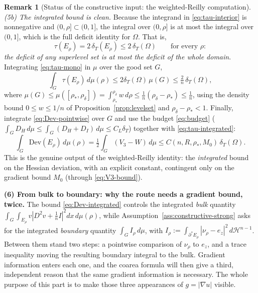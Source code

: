 \documentclass[11pt]{amsart}
\theoremstyle{definition}
\newtheorem{remark}[theorem]{Remark}
\newcommand{\Om}{\Omega}
\newcommand{\dT}{\delta_T}
\newcommand{\rstar}{\rho_*}
\newcommand{\rdel}{\rho_\delta}
\newcommand{\wt}{w}
\newcommand{\Hn}{\mathcal H^{n-1}}
\begin{document}
\begin{remark}[Status of the constructive input: the weighted-Reilly computation]
\emph{(5b) The integrated bound is clean.}  Because the integrand in
\eqref{eq:tau-interior} is nonnegative and \((0,\rho]\subset(0,1]\), the integral
over \((0,\rho]\) is at most the integral over \((0,1]\), which is the full
deficit identity for \(\Om\).  That is,
\begin{equation}\label{eq:tau-mono}
   \tau(E_\rho)=2\,\delta_T(E_\rho)\le2\,\dT(\Om)\qquad\text{for every }\rho:
\end{equation}
\emph{the deficit of any superlevel set is at most the deficit of the whole
domain}.  Integrating \eqref{eq:tau-mono} in \(\mu\) over the good set \(G\),
\begin{equation}\label{eq:tau-integrated}
   \int_G\tau(E_\rho)\,d\mu(\rho)\le2\dT(\Om)\,\mu(G)\le\tfrac2n\,\dT(\Om),
\end{equation}
where \(\mu(G)\le\mu([\rstar,\rdel])=\int_{\rstar}^{\rdel}\wt\,d\rho
\le\tfrac1n(\rdel-\rstar)\le\tfrac1n\), using the density bound
\(0\le\wt\le1/n\) of Proposition~\ref{prop:levelset} and \(\rdel-\rstar<1\).
Finally, integrate \eqref{eq:Dev-pointwise} over \(G\) and use the budget
\eqref{eq:budget} (\(\int_G D_H\,d\mu\le\int_G(D_H+D_I)\,d\mu\le C_L\dT\))
together with \eqref{eq:tau-integrated}:
\begin{equation}\label{eq:Dev-integrated}
   \int_G\mathrm{Dev}(E_\rho)\,d\mu(\rho)
   =\tfrac12\int_G(V_3-W)\,d\mu
   \le C(n,R,\rstar,M_0)\,\dT(\Om).
\end{equation}
This is the genuine output of the weighted-Reilly identity: the
\emph{integrated} bound on the Hessian deviation, with an explicit constant,
contingent only on the gradient bound \(M_0\) (through \eqref{eq:V3-bound}).

\medskip
\noindent\textbf{(6) From bulk to boundary: why the route needs a gradient bound, twice.}
The bound \eqref{eq:Dev-integrated} controls the integrated \emph{bulk}
quantity \(\int_G\!\int_{E_\rho}v|D^2v+\tfrac1n I|^2dx\,d\mu(\rho)\), while
Assumption~\ref{ass:constructive-strong} asks for the integrated \emph{boundary}
quantity \(\int_G I_\rho\,d\mu\), with
\(I_\rho:=\int_{\partial^*E_\rho}|\nu_\rho-e_z|^2\,d\Hn\).  Between them stand
two steps: a pointwise comparison of \(\nu_\rho\) to \(e_z\), and a trace
inequality moving the resulting boundary integral to the bulk.  Gradient
information enters each one, and the coarea formula will then give a third,
independent reason that the same gradient information is necessary.  The whole
purpose of this part is to make those three appearances of \(g=|\nabla u|\)
visible.


\end{remark}
\end{document}
